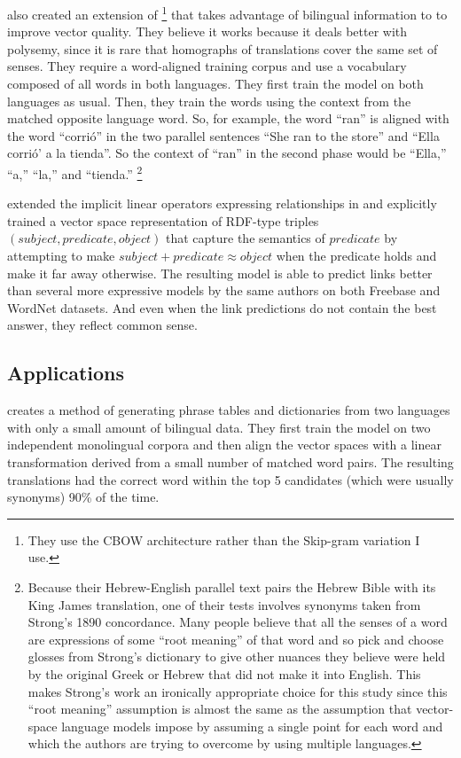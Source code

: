 \citep{Wolf} also created an extension of \modelname{}\footnote{They use the
CBOW architecture rather than the Skip-gram variation I
use.} that takes advantage of
bilingual information to to improve vector quality. They believe it works 
because it deals better with polysemy, since it is rare that homographs of 
translations cover the same set of senses. They require a word-aligned 
training corpus and use a vocabulary 
composed of all words in both languages. They first train the model on both
languages as usual. Then, they train the words using the context from the 
matched opposite language word. So, for example, the word 
``ran'' is aligned with the word ``corri\'o'' in the two parallel sentences 
``She ran to the store'' and ``Ella corri\'o' a la tienda''. So the context of 
``ran'' in the second phase would be ``Ella,'' ``a,'' ``la,'' and ``tienda.''
\footnote{Because their Hebrew-English parallel text pairs the 
Hebrew Bible with its King James translation, one of their tests involves 
synonyms taken from Strong's 1890 
concordance. Many people believe that
all the senses of a word are expressions of some ``root meaning'' of that word 
and so
pick and choose glosses from Strong's dictionary to give other nuances they 
believe were held by the 
original Greek or Hebrew that did not make it into English. This makes 
Strong's work an ironically appropriate choice for this study 
since this ``root meaning'' assumption is almost the same as the assumption that 
vector-space language models impose by assuming a single point for each word 
and which the authors are trying to overcome by using multiple languages.}

\citep{Bordes2013} extended the implicit linear operators expressing 
relationships in \citep{Mikolov2013b} and explicitly trained a vector
space representation of RDF-type triples 
$(subject,predicate,object)$ that 
capture the semantics of $predicate$ by attempting to make 
$subject+predicate \approx object$ when the predicate holds and make it
far away otherwise. The resulting model is able to predict links better than
several more expressive models by the same authors on both Freebase and 
WordNet datasets. And even when the link predictions do not contain the best
answer, they reflect common sense.

\subsection{Applications}

\citep{Mikolov2013a} creates a method of generating phrase tables and 
dictionaries from two languages with only a small amount of bilingual data.
They first train the \modelname{} model on two independent monolingual corpora 
and then align the vector spaces with a linear transformation derived from a 
small number of matched word pairs. The resulting translations had the 
correct word within the top 5 candidates (which were usually synonyms) 90\% of 
the time.

